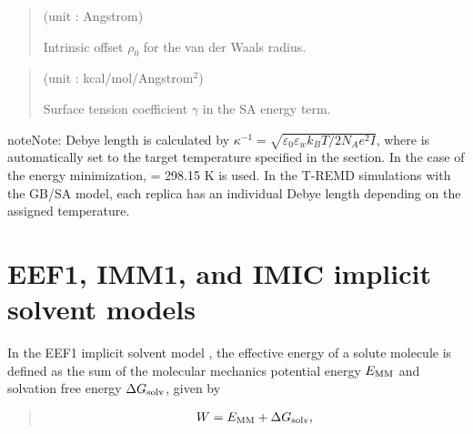 \documentclass[a4paper,11pt,oneside,english]{sphinxmanual}
\begin{document}
 
\begin{quote}

 (unit : Angstrom)

Intrinsic offset \(\rho_0\) for the van der Waals radius.
\end{quote}

 
\begin{quote}

 (unit : kcal/mol/Angstrom$^{\text{2}}$)

Surface tension coefficient \(\gamma\) in the SA energy term.
\end{quote}

\begin{sphinxadmonition}{note}{Note:}
Debye length is calculated by
\({\kappa ^{ - 1}} = \sqrt {{\varepsilon _0}{\varepsilon _w}{k_B}T/2{N_A}{e^2}I}\), where
 is automatically set to the target temperature specified in the \sphinxstylestrong{{[}DYNAMICS{]}} section.
In the case of the energy minimization,  = 298.15 K is used. In the T-REMD simulations with
the GB/SA model, each replica has an individual Debye length depending on the assigned temperature.
\end{sphinxadmonition}


\section{EEF1, IMM1, and IMIC implicit solvent models}
\label{\detokenize{05_Energy:eef1-imm1-and-imic-implicit-solvent-models}}
In the EEF1 implicit solvent model , the effective energy  of a solute molecule is defined as the sum of
the molecular mechanics potential energy \(E_{\rm{MM}}\) and solvation free energy \(\Delta {G_{{\rm{solv}}}}\), given by
\begin{quote}

\vspace{-5mm}
\begin{equation*}
\begin{split}W = E_{\rm{MM}} + \Delta {G_{{\rm{solv}}}},\end{split}
\end{equation*}
\vspace{-3mm}
\end{quote}
\end{document}
